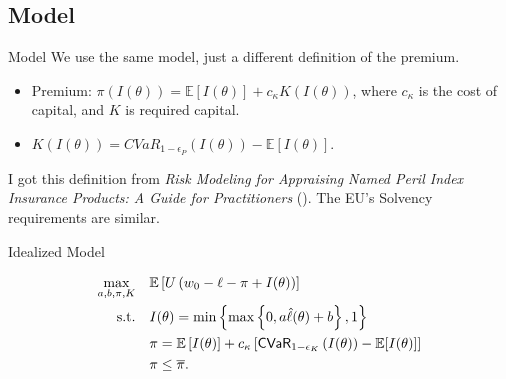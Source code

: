 \documentclass{beamer}
\begin{document}
\subsection{Model}
\begin{frame}{Model}
    We use the same model, just a different definition of the premium. 
    \begin{itemize}
        \setlength\itemsep{2em}
        \item Premium: $\pi(I(\theta)) = \mathbb{E}[I(\theta)] + c_{\kappa} K(I(\theta))$, where $c_{\kappa}$ is the cost of capital, and $K$ is required capital.
    \item $K(I(\theta)) = CVaR_{1-\epsilon_P}\left ( I(\theta) \right ) - \mathbb{E}[I(\theta)]$.
    \end{itemize}
    I got this definition from \textit{Risk Modeling for Appraising Named Peril Index Insurance Products: A Guide for Practitioners} (\cite{mapfumo2017risk}). The EU's Solvency requirements are similar. 
\end{frame}

\begin{frame}{Idealized Model}
\label{ideal-model}

 
\begin{align}
    \max_{a,b,\pi, K}  & \quad \mathbb{E} \left [ U\left ( w_0 - \ell - \pi + I(\theta) \right ) \right ] \label{cons-objective}\\
    \text{s.t.} & \quad I(\theta) =  \min \left \{\max \left \{0,a\hat{\ell}(\theta) + b \right \}, 1 \right \}\label{cons-contract}\\
    & \quad \pi = \mathbb{E}\left [ I(\theta) \right ] + c_{\kappa} \left[ {\sf CVaR}_{1-\epsilon_K}\left ( I(\theta)\right )  - \mathbb{E}[I(\theta)]  \right] \\
    &\quad \pi \leq \overline{\pi}.\label{cons-capital}
\end{align}
\end{frame}
\end{document}
